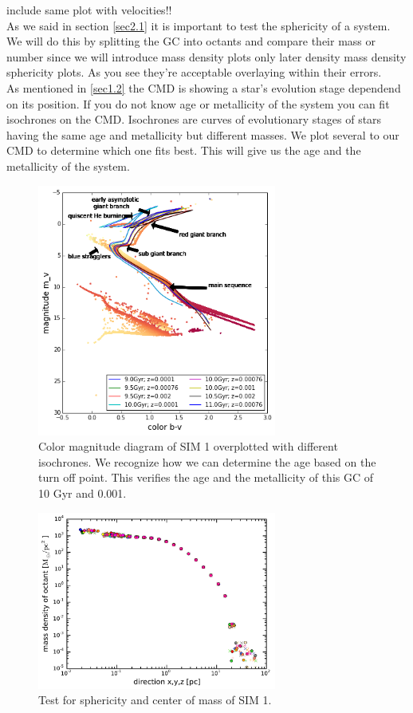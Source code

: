 \color{red} include same plot with velocities!! \color{black}\\
As we said in section \ref{sec2.1} it is important to test the sphericity of a system. We will do this by splitting the \ac{GC} into octants and compare their mass \color{red} or number since we will introduce mass density plots only later \color{black} density \color{red} mass density sphericity plots\color{black}. As you see they're acceptable overlaying \color{red} within their errors. \color{black}
\\
As mentioned in \ref{sec1.2} the \ac{CMD} is showing a star's evolution stage dependend on its position. If you do not know age or metallicity of the system you can fit isochrones on the \ac{CMD}. Isochrones are curves of evolutionary stages of stars having the same age and metallicity but different masses. We plot several to our \ac{CMD} to determine which one fits best. This will give us the age and the metallicity of the system. 
\begin{figure}[htbp]
\centering
\includegraphics[width=0.7\textwidth]{Plots/cmd_isochrones}
\caption{Color magnitude diagram of SIM 1 overplotted with different isochrones. We recognize how we can determine the age based on the turn off point. This verifies the age and the metallicity of this \ac{GC} of 10 Gyr and 0.001.}
	\label{fig:cmd_isochrones}
\end{figure}

\begin{figure}[htbp]
\centering
\includegraphics[width=0.7\textwidth]{Plots/sphericity_com.pdf}
\caption{Test for sphericity and center of mass of SIM 1.}
\label{fig:sphericity_com}
\end{figure}

